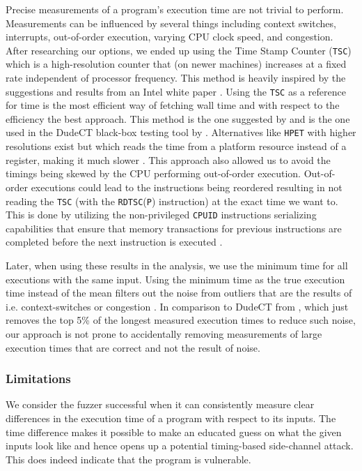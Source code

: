 Precise measurements of a program's execution time are not trivial to perform. 
Measurements can be influenced by several things including context switches, interrupts, out-of-order execution, varying CPU clock speed, and congestion. 
After researching our options, we ended up using the Time Stamp Counter (\texttt{TSC}) which is a high-resolution counter that (on newer machines) increases at a fixed rate independent of processor frequency. 
This method is heavily inspired by the suggestions and results from an Intel white paper \citep{intel-benchmark-code-execution}.
Using the \texttt{TSC} as a reference for time is the most efficient way of fetching wall time and with respect to the efficiency the best approach.
This method is the one suggested by \citep{intel-benchmark-code-execution} and is the one used in the DudeCT black-box testing tool by \citep{dudect}.
Alternatives like \texttt{HPET} with higher resolutions exist but which reads the time from a platform resource instead of a register, making it much slower \citep[b]{intel-reference}.
This approach also allowed us to avoid the timings being skewed by the CPU performing out-of-order execution.
Out-of-order executions could lead to the instructions being reordered resulting in not reading the \texttt{TSC} (with the \texttt{RDTSC}(\texttt{P}) instruction) at the exact time we want to. 
This is done by utilizing the non-privileged \texttt{CPUID} instructions serializing capabilities that ensure that memory transactions for previous instructions are completed before the next instruction is executed \citep[a]{intel-reference}.

Later, when using these results in the analysis, we use the minimum time for all executions with the same input.
Using the minimum time as the true execution time instead of the mean filters out the noise from outliers that are the results of i.e. context-switches or congestion \citep{robust-benchmarking}. 
In comparison to DudeCT from \citep{dudect}, which just removes the top 5\% of the longest measured execution times to reduce such noise, our approach is not prone to accidentally removing measurements of large execution times that are correct and not the result of noise.

\subsubsection{Limitations}
We consider the fuzzer successful when it can consistently measure clear differences in the execution time of a program with respect to its inputs. 
The time difference makes it possible to make an educated guess on what the given inputs look like and hence opens up a potential timing-based side-channel attack. 
This does indeed indicate that the program is vulnerable.

